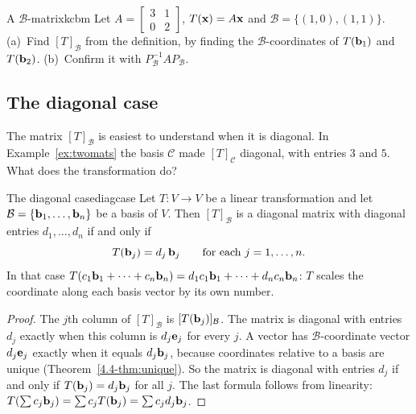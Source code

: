 \documentclass[11pt]{article}
\begin{document}
\begin{kc}{A $\mathcal{B}$-matrix}{kcbm}
Let $A=\begin{bmatrix}3&1\\0&2\end{bmatrix}$, $T(\mathbf{x})=A\mathbf{x}$ and $\mathcal{B}=\{(1,0),(1,1)\}$. (a)~Find $[T]_{\mathcal{B}}$ from the definition, by finding the $\mathcal{B}$-coordinates of $T(\mathbf{b}_1)$ and $T(\mathbf{b}_2)$. (b)~Confirm it with $P_{\mathcal{B}}^{-1}AP_{\mathcal{B}}$.
\end{kc}

\subsection*{The diagonal case}

The matrix $[T]_{\mathcal{B}}$ is easiest to understand when it is diagonal. In Example~\ref{ex:twomats} the basis $\mathcal{C}$ made $[T]_{\mathcal{C}}$ diagonal, with entries $3$ and $5$. What does the transformation do?

\begin{thm}{The diagonal case}{diagcase}
Let $T:V\to V$ be a linear transformation and let $\mathcal{B}=\{\mathbf{b}_1,\dots,\mathbf{b}_n\}$ be a basis of $V$. Then $[T]_{\mathcal{B}}$ is a diagonal matrix with diagonal entries $d_1,\dots,d_n$ if and only if
\[
T(\mathbf{b}_j)=d_j\,\mathbf{b}_j\qquad\text{for each }j=1,\dots,n.
\]
In that case $T(c_1\mathbf{b}_1+\cdots+c_n\mathbf{b}_n)=d_1c_1\mathbf{b}_1+\cdots+d_nc_n\mathbf{b}_n$: $T$ scales the coordinate along each basis vector by its own number.
\end{thm}

\begin{proof}
The $j$th column of $[T]_{\mathcal{B}}$ is $[T(\mathbf{b}_j)]_{\mathcal{B}}$. The matrix is diagonal with entries $d_j$ exactly when this column is $d_j\mathbf{e}_j$ for every $j$. A vector has $\mathcal{B}$-coordinate vector $d_j\mathbf{e}_j$ exactly when it equals $d_j\mathbf{b}_j$, because coordinates relative to a basis are unique (Theorem~\ref{4.4-thm:unique}). So the matrix is diagonal with entries $d_j$ if and only if $T(\mathbf{b}_j)=d_j\mathbf{b}_j$ for all $j$. The last formula follows from linearity: $T(\sum c_j\mathbf{b}_j)=\sum c_jT(\mathbf{b}_j)=\sum c_jd_j\mathbf{b}_j$.
\end{proof}
\end{document}
